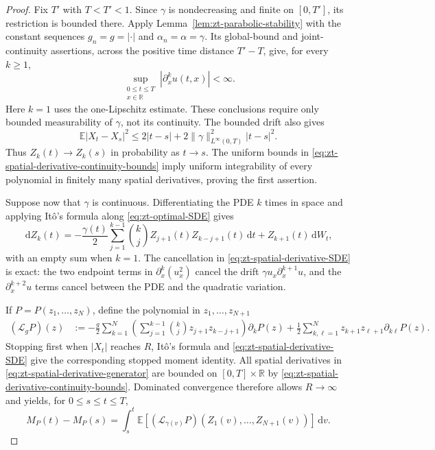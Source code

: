 \documentclass[10pt]{amsart}
\theoremstyle{definition}
\theoremstyle{remark}
\numberwithin{equation}{section}
\newcommand{\R}{\mathbb R}
\newcommand{\E}{\mathbb E}
\newcommand{\1}{\mathbf 1}
\newcommand{\dd}{\,\mathrm d}
\begin{document}
\iffalse
\begin{proof}
Fix $T'$ with $T<T'<1$. Since $\gamma$ is nondecreasing and finite on $[0,T']$, its restriction is bounded there. Apply Lemma~\ref{lem:zt-parabolic-stability} with the constant sequences $g_n=g=|\cdot|$ and $\alpha_n=\alpha=\gamma$. Its global-bound and joint-continuity assertions, across the positive time distance $T'-T$, give, for every $k\geq1$,
\begin{equation}
 \sup_{\substack{0\leq t\leq T\\x\in\R}}
 |\partial_x^ku(t,x)|<\infty.                                \label{eq:zt-spatial-derivative-continuity-bounds}
\end{equation}
Here $k=1$ uses the one-Lipschitz estimate. These conclusions require only bounded measurability of $\gamma$, not its continuity. The bounded drift also gives
\begin{equation*}
 \E|X_t-X_s|^2
 \leq2|t-s|+2\|\gamma\|_{L^\infty(0,T)}^2|t-s|^2.
\end{equation*}
Thus $Z_k(t)\to Z_k(s)$ in probability as $t\to s$.  The uniform bounds in \eqref{eq:zt-spatial-derivative-continuity-bounds} imply uniform integrability of every polynomial in finitely many spatial derivatives, proving the first assertion.

Suppose now that $\gamma$ is continuous.  Differentiating the PDE $k$ times in space and applying It\^o's formula along \eqref{eq:zt-optimal-SDE} gives
\begin{equation}
 \dd Z_k(t)
 =-\frac{\gamma(t)}2
   \sum_{j=1}^{k-1}\binom{k}{j}
   Z_{j+1}(t)Z_{k-j+1}(t)\dd t
   +Z_{k+1}(t)\dd W_t,                                      \label{eq:zt-spatial-derivative-SDE}
\end{equation}
with an empty sum when $k=1$.  The cancellation in \eqref{eq:zt-spatial-derivative-SDE} is exact: the two endpoint terms in $\partial_x^k(u_x^2)$ cancel the drift $\gamma u_x\partial_x^{k+1}u$, and the $\partial_x^{k+2}u$ terms cancel between the PDE and the quadratic variation.

If $P=P(z_1,\ldots,z_N)$, define the polynomial in $z_1,\ldots,z_{N+1}$
\begin{align}
 (\mathcal L_gP)(z)
 &:=-\frac g2\sum_{k=1}^N
   \left(\sum_{j=1}^{k-1}\binom{k}{j}
   z_{j+1}z_{k-j+1}\right)\partial_kP(z)                    +\frac12\sum_{k,\ell=1}^N
   z_{k+1}z_{\ell+1}\partial_{k\ell}P(z).                   \label{eq:zt-spatial-derivative-generator}
\end{align}
Stopping first when $|X_t|$ reaches $R$, It\^o's formula and \eqref{eq:zt-spatial-derivative-SDE} give the corresponding stopped moment identity.  All spatial derivatives in \eqref{eq:zt-spatial-derivative-generator} are bounded on $[0,T]\times\R$ by \eqref{eq:zt-spatial-derivative-continuity-bounds}.  Dominated convergence therefore allows $R\to\infty$ and yields, for $0\leq s\leq t\leq T$,
\begin{equation}
 M_P(t)-M_P(s)
 =\int_s^t\E\left[(\mathcal L_{\gamma(v)}P)
 (Z_1(v),\ldots,Z_{N+1}(v))\right]\dd v.                    \label{eq:zt-spatial-derivative-moment-integral}
\end{equation}


\end{proof}
\end{document}
